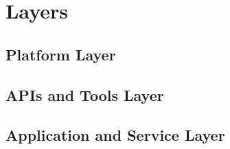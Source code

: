 \section{Layers}

\subsection{Platform Layer}

\subsection{APIs and Tools Layer}

\subsection{Application and Service Layer}